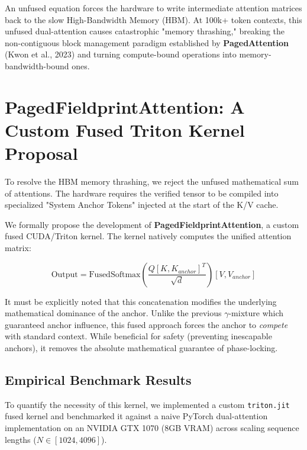 \documentclass{article}
\begin{document}
An unfused equation forces the hardware to write intermediate attention matrices back to the slow High-Bandwidth Memory (HBM). At 100k+ token contexts, this unfused dual-attention causes catastrophic "memory thrashing," breaking the non-contiguous block management paradigm established by \textbf{PagedAttention} (Kwon et al., 2023) and turning compute-bound operations into memory-bandwidth-bound ones.

\section{PagedFieldprintAttention: A Custom Fused Triton Kernel Proposal}
To resolve the HBM memory thrashing, we reject the unfused mathematical sum of attentions. The hardware requires the verified tensor to be compiled into specialized "System Anchor Tokens" injected at the start of the K/V cache.

We formally propose the development of \textbf{PagedFieldprintAttention}, a custom fused CUDA/Triton kernel. The kernel natively computes the unified attention matrix:

\begin{equation}
\text{Output} = \text{FusedSoftmax}\left(\frac{Q [K, K_{anchor}]^T}{\sqrt{d}}\right) [V, V_{anchor}]
\end{equation}

It must be explicitly noted that this concatenation modifies the underlying mathematical dominance of the anchor. Unlike the previous $\gamma$-mixture which guaranteed anchor influence, this fused approach forces the anchor to \emph{compete} with standard context. While beneficial for safety (preventing inescapable anchors), it removes the absolute mathematical guarantee of phase-locking.

\subsection{Empirical Benchmark Results}
To quantify the necessity of this kernel, we implemented a custom \texttt{triton.jit} fused kernel and benchmarked it against a naive PyTorch dual-attention implementation on an NVIDIA GTX 1070 (8GB VRAM) across scaling sequence lengths ($N \in [1024, 4096]$).
\end{document}
